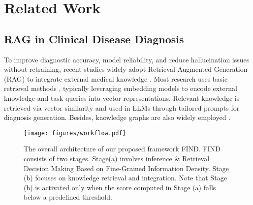 \section{Related Work}
\subsection{RAG in Clinical Disease Diagnosis}
To improve diagnostic accuracy, model reliability, and reduce hallucination issues without retraining, recent studies widely adopt Retrieval-Augmented Generation (RAG) to integrate external medical knowledge \cite{llmdd69_wen2023mindmap,llmdd70_wu2024guiding,llmdd79_shi2023retrieval,llmdd141_thompson2023large,llmdd142_zhao2024heterogeneous}. Most research uses basic retrieval methods \cite{llmdd74_ge2024development,llmdd79_shi2023retrieval,llmdd140_zhang2023integrating,llmdd142_zhao2024heterogeneous,llmdd148_oniani2024enhancing}, typically leveraging embedding models to encode external knowledge and task queries into vector representations. Relevant knowledge is retrieved via vector similarity and used in LLMs through tailored prompts for diagnosis generation. Besides, knowledge graphs are also widely employed \cite{llmdd69_wen2023mindmap,llmdd70_wu2024guiding,llmdd71_gao2023large}. 


\begin{figure*}[t]
	\centering
	\texttt{[image: figures/workflow.pdf]}
	\caption{The overall architecture of our proposed framework FIND. FIND consists of two stages. Stage(a) involves inference \& Retrieval Decision Making Based on Fine-Grained Information Density. Stage (b) focuses on knowledge retrieval and integration. Note that Stage (b) is activated only when the score computed in Stage (a) falls below a predefined threshold.}
	\label{workflow}
\end{figure*}

